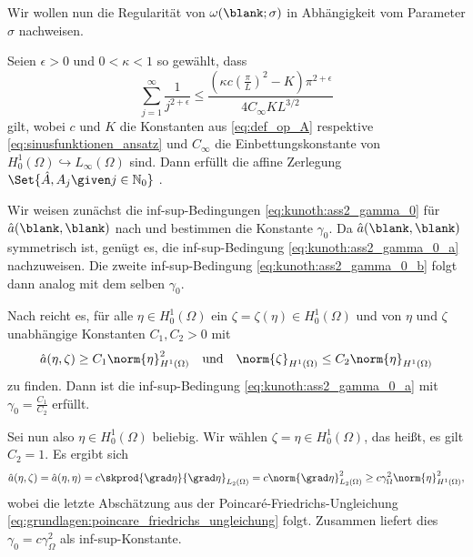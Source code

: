 Wir wollen nun die Regularität von $\omega(\blank; \sigma)$ in Abhängigkeit vom Parameter $\sigma$ nachweisen.

\begin{Satz}
\label{satz:regularitaet_nachrechnen}
    Seien $\epsilon > 0$ und $0 < \kappa < 1$ so gewählt, dass
    \begin{equation}
        \sum_{j = 1}^{\infty} \frac{1}{j^{2 + \epsilon}} \leq \frac{(\kappa c (\tfrac{\pi}{L})^{2} - K) \pi^{2 + \epsilon}}{4 C_{\infty} K L^{3/2}}
    \end{equation}
    gilt,
    wobei $c$ und $K$ die Konstanten aus \eqref{eq:def_op_A} respektive \eqref{eq:sinusfunktionen_ansatz} und $C_{\infty}$ die Einbettungskonstante von $H^{1}_{0}(\Omega) \hookrightarrow L_{\infty}(\Omega)$ sind.
    Dann erfüllt die affine Zerlegung $\Set{\hat A, A_{j} \given j \in \mathbb{N}_{0}}$ .

    \begin{Beweis}
        Wir weisen zunächst die inf-sup-Bedingungen \eqref{eq:kunoth:ass2_gamma_0} für $\hat a(\blank, \blank)$ nach und bestimmen die Konstante $\gamma_{0}$.
        Da $\hat a(\blank, \blank)$ symmetrisch ist, genügt es, die inf-sup-Bedingung \eqref{eq:kunoth:ass2_gamma_0_a} nachzuweisen. Die zweite inf-sup-Bedingung \eqref{eq:kunoth:ass2_gamma_0_b} folgt dann analog mit dem selben $\gamma_{0}$.

        Nach  reicht es, für alle $\eta \in H^{1}_{0}(\Omega)$ ein $\zeta = \zeta(\eta) \in H^{1}_{0}(\Omega)$ und von $\eta$ und $\zeta$ unabhängige Konstanten $C_{1}, C_{2} > 0$ mit
        \begin{equation}
            \hat a(\eta, \zeta) \geq C_{1} \norm{\eta}_{H^{1}(\Omega)}^{2} \quad \text{und} \quad \norm{\zeta}_{H^{1}(\Omega)} \leq C_{2} \norm{\eta}_{H^{1}(\Omega)}
        \end{equation}
        zu finden.
        Dann ist die inf-sup-Bedingung \eqref{eq:kunoth:ass2_gamma_0_a} mit $\gamma_{0} = \frac{C_{1}}{C_{2}}$ erfüllt.

        Sei nun also $\eta \in H^{1}_{0}(\Omega)$ beliebig.
        Wir wählen $\zeta = \eta \in H^{1}_{0}(\Omega)$, das heißt, es gilt $C_{2} = 1$.
        Es ergibt sich
        \begin{align}
            \hat a(\eta, \zeta) = \hat a(\eta, \eta) = c \skprod{\grad \eta}{\grad \eta}_{L_{2}(\Omega)} = c \norm{\grad \eta}_{L_{2}(\Omega)}^{2} \geq c \gamma_{\Omega}^{2} \norm{\eta}_{H^{1}(\Omega)}^{2},
        \end{align}
        wobei die letzte Abschätzung aus der Poincaré-Friedrichs-Ungleichung \eqref{eq:grundlagen:poincare_friedrichs_ungleichung} folgt.
        Zusammen liefert dies $\gamma_{0} = c \gamma_{\Omega}^{2}$ als inf-sup-Konstante.


\end{Beweis}
\end{Satz}
